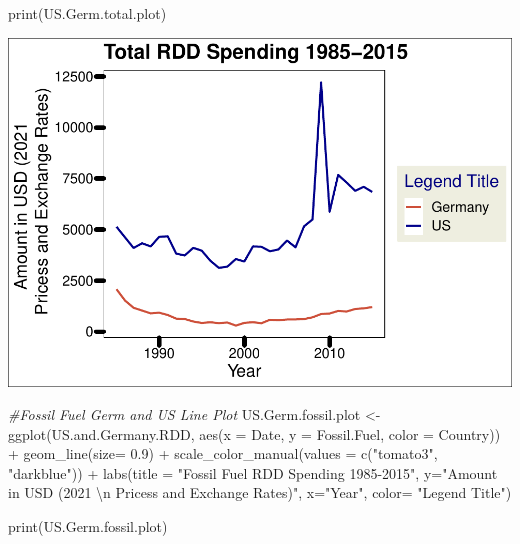 \documentclass[
  12pt,
]{article}
\newenvironment{Shaded}{\begin{snugshade}}{\end{snugshade}}
\newcommand{\AttributeTok}[1]{\textcolor[rgb]{0.77,0.63,0.00}{#1}}
\newcommand{\CommentTok}[1]{\textcolor[rgb]{0.56,0.35,0.01}{\textit{#1}}}
\newcommand{\FloatTok}[1]{\textcolor[rgb]{0.00,0.00,0.81}{#1}}
\newcommand{\FunctionTok}[1]{\textcolor[rgb]{0.00,0.00,0.00}{#1}}
\newcommand{\NormalTok}[1]{#1}
\newcommand{\OtherTok}[1]{\textcolor[rgb]{0.56,0.35,0.01}{#1}}
\newcommand{\SpecialCharTok}[1]{\textcolor[rgb]{0.00,0.00,0.00}{#1}}
\newcommand{\StringTok}[1]{\textcolor[rgb]{0.31,0.60,0.02}{#1}}
\begin{document}
\begin{Shaded}
\begin{Highlighting}[]
\FunctionTok{print}\NormalTok{(US.Germ.total.plot)}
\end{Highlighting}
\end{Shaded}

\includegraphics{Chang_Jenkins_Mullens_ENV872_Final_files/figure-latex/unnamed-chunk-1-3.pdf}

\begin{Shaded}
\begin{Highlighting}[]
\CommentTok{\#Fossil Fuel Germ and US Line Plot}
\NormalTok{US.Germ.fossil.plot }\OtherTok{\textless{}{-}} \FunctionTok{ggplot}\NormalTok{(US.and.Germany.RDD,}
                              \FunctionTok{aes}\NormalTok{(}\AttributeTok{x =}\NormalTok{ Date,}
                                  \AttributeTok{y =}\NormalTok{ Fossil.Fuel, }
                                  \AttributeTok{color =}\NormalTok{ Country)) }\SpecialCharTok{+} 
  \FunctionTok{geom\_line}\NormalTok{(}\AttributeTok{size=} \FloatTok{0.9}\NormalTok{) }\SpecialCharTok{+}
  \FunctionTok{scale\_color\_manual}\NormalTok{(}\AttributeTok{values =} \FunctionTok{c}\NormalTok{(}\StringTok{"tomato3"}\NormalTok{, }\StringTok{"darkblue"}\NormalTok{)) }\SpecialCharTok{+}
  \FunctionTok{labs}\NormalTok{(}\AttributeTok{title =} \StringTok{"Fossil Fuel RDD Spending 1985{-}2015"}\NormalTok{,}
       \AttributeTok{y=}\StringTok{"Amount in USD (2021 }\SpecialCharTok{\textbackslash{}n}\StringTok{ Pricess and Exchange Rates)"}\NormalTok{,}
       \AttributeTok{x=}\StringTok{"Year"}\NormalTok{,}
       \AttributeTok{color=} \StringTok{"Legend Title"}\NormalTok{)}

\FunctionTok{print}\NormalTok{(US.Germ.fossil.plot)}
\end{Highlighting}
\end{Shaded}
\end{document}
